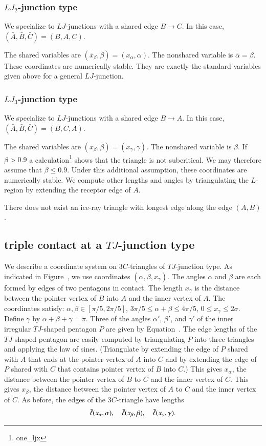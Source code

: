 \subsubsection{$LJ_2$-junction type}

We specialize to $LJ$-junctions with a shared edge $B\to C$.
In this case, $(\bar A,\bar B,\bar C)=(B,A,C)$.

The shared variables are $(\bar x_\beta,\bar\beta)=(x_\alpha,\alpha)$.
The nonshared variable is $\bar\alpha=\beta$.  These coordinates are
numerically stable.  They are exactly the standard variables given
above for a general $LJ$-junction.


\subsubsection{$LJ_3$-junction type}

We specialize to $LJ$-junctions with a shared edge $B\to A$.
In this case, $(\bar A,\bar B,\bar C)=(B,C,A)$.

The shared variables are $(\bar x_\beta,\bar\beta)=(x_\gamma,\gamma)$.
The nonshared variable is $\beta$.  If $\beta > 0.9$ a
calculation\footnote{one\_ljx} shows that the triangle is not
subcritical.  We may therefore assume that $\beta\le 0.9$.  Under this
additional assumption, these coordinates are numerically stable.  We
compute other lengths and angles by triangulating the $L$-region by
extending the receptor edge of $A$.

There does not exist an ice-ray triangle with longest edge along the
edge $(A,B)$.


\subsection{triple contact at a $TJ$-junction type}

We describe a coordinate system on $3C$-triangles of $TJ$-junction
type.  As indicated in Figure~, we use coordinates
$(\alpha,\beta,x_\gamma)$.  The angles $\alpha$ and $\beta$ are each
formed by edges of two pentagons in contact.  The length $x_\gamma$ is
the distance between the pointer vertex of $B$ into $A$ and the inner
vertex of $A$.  The coordinates satisfy:
$\alpha,\beta\in[\pi/5,2\pi/5]$, $3\pi/5\le \alpha+\beta\le 4\pi/5$,
$0\le x_\gamma\le 2\sigma$.  Define $\gamma$ by
$\alpha+\beta+\gamma=\pi$.  Three of the angles $\alpha'$, $\beta'$,
and $\gamma'$ of the inner irregular $TJ$-shaped pentagon $P$ are
given by Equation~.  The edge lengths of the $TJ$-shaped
pentagon are easily computed by triangulating $P$ into three triangles
and applying the law of sines.  (Triangulate by extending the edge of
$P$ shared with $A$ that ends at the pointer vertex of $A$ into $C$
and by extending the edge of $P$ shared with $C$ that contains pointer
vertex of $B$ into $C$.)  This gives $x_\alpha$, the distance between
the pointer vertex of $B$ to $C$ and the inner vertex of $C$.  This
gives $x_\beta$, the distance between the pointer vertex of $A$ to $C$
and the inner vertex of $C$.  As before, the edges of the
$3C$-triangle have lengths
\[
\bar\ell(x_\alpha,\alpha),\quad \bar\ell(x_\beta,\beta),\quad \bar\ell(x_\gamma,\gamma).
\]



